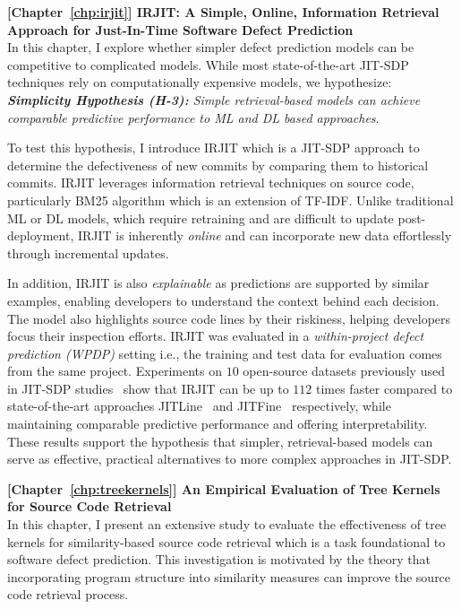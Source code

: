 \documentclass[\main/thesis.tex]{subfiles}
\begin{document}
\textbf{[Chapter~\ref{chp:irjit}] IRJIT: A Simple, Online, Information Retrieval Approach for Just-In-Time Software Defect Prediction}\\

In this chapter, I explore whether simpler defect prediction models can be competitive to complicated models.
While most state-of-the-art JIT-SDP techniques rely on computationally expensive models, we hypothesize:\\
\textit{\textbf{Simplicity Hypothesis (H-3):} Simple retrieval-based models can achieve comparable predictive performance to ML and DL based approaches}. 


To test this hypothesis, I introduce IRJIT which is a JIT-SDP approach to determine the defectiveness of new commits by comparing them to historical commits. 
IRJIT leverages information retrieval techniques on source code, particularly BM25 algorithm which is an extension of TF-IDF. Unlike traditional ML or DL models, which require retraining and are difficult to update post-deployment, IRJIT is inherently \textit{online} and can incorporate new data effortlessly through incremental updates.


In addition, IRJIT is also \textit{explainable} as predictions are supported by similar examples, enabling developers to understand the context behind each decision. The model also highlights source code lines by their riskiness, helping developers focus their inspection efforts.
IRJIT was evaluated in a \textit{within-project defect prediction (WPDP)} setting i.e., the training and test data for evaluation comes from the same project. Experiments on $10$ open-source datasets previously used in JIT-SDP studies~\cite{cabral2019class}\cite{cabral2023investigation} show that IRJIT can be up to $112$ times faster compared to state-of-the-art approaches JITLine~\cite{pornprasit2021jitline} and JITFine~\cite{jitfine} respectively, while maintaining comparable predictive performance and offering interpretability. These results support the hypothesis that simpler, retrieval-based models can serve as effective, practical alternatives to more complex approaches in JIT-SDP.


\textbf{[Chapter~\ref{chp:treekernels}] An Empirical Evaluation of Tree Kernels for Source Code Retrieval}\\ 
In this chapter, I present an extensive study to evaluate the effectiveness of tree kernels for similarity-based source code retrieval which is a task foundational to software defect prediction. This investigation is motivated by the theory that
incorporating program structure into similarity measures can improve the source code retrieval process.
\end{document}
